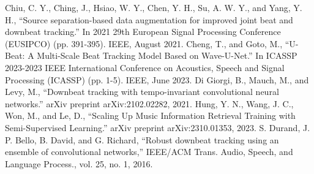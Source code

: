 \documentclass[conference]{IEEEtran}
\begin{document}
\begin{thebibliography}{00}
 Chiu, C. Y., Ching, J., Hsiao, W. Y., Chen, Y. H., Su, A. W. Y., and Yang, Y. H., ``Source separation-based data augmentation for improved joint beat and downbeat tracking.'' In 2021 29th European Signal Processing Conference (EUSIPCO) (pp. 391-395). IEEE, August 2021. 
 Cheng, T., and Goto, M., ``U-Beat: A Multi-Scale Beat Tracking Model Based on Wave-U-Net.'' In ICASSP 2023-2023 IEEE International Conference on Acoustics, Speech and Signal Processing (ICASSP) (pp. 1-5). IEEE, June 2023.
 Di Giorgi, B., Mauch, M., and Levy, M., ``Downbeat tracking with tempo-invariant convolutional neural networks.'' arXiv preprint arXiv:2102.02282, 2021.
 Hung, Y. N., Wang, J. C., Won, M., and Le, D., ``Scaling Up Music Information Retrieval Training with Semi-Supervised Learning.'' arXiv preprint arXiv:2310.01353, 2023.
 S. Durand, J. P. Bello, B. David, and G. Richard, “Robust downbeat tracking using an ensemble of convolutional networks,” IEEE/ACM Trans. Audio, Speech, and Language Process., vol. 25, no. 1, 2016. 
\end{thebibliography}
\end{document}
